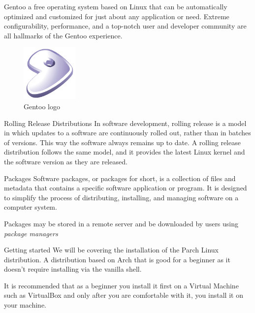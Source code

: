 \documentclass{beamer}
\begin{document}
\begin{frame}{Gentoo}
		a free operating system based on Linux that can be automatically optimized 
		and customized for just about any application or need. Extreme configurability,
		performance, and a top-notch user and developer community are all hallmarks of the Gentoo experience. 
		\begin{figure}
			\begin{center}
				\includegraphics[width=0.25\textwidth]{images/gentoo-logo.png}
			\end{center}
			\caption{Gentoo logo}
		\end{figure}
\end{frame}

\begin{frame}{Rolling Release Distributions}
	In software development, rolling release is a model in which updates to a software are continuously rolled out, 
	rather than in batches of versions. This way the software always remains up to date. A rolling release distribution
	follows the same model, and it provides the latest Linux kernel and the software version as they are released.
\end{frame}

\begin{frame}{Packages}
	Software packages, or packages for short, is a collection of files and metadata that contains a specific software 
	application or program. It is designed to simplify the process of distributing, installing, and managing software 
	on a computer system.

	Packages may be stored in a remote server and be downloaded by users using \textit{package managers}
\end{frame}

\begin{frame}{Getting started}
    We will be covering the installation of the Parch Linux distribution. A distribution based on Arch that
    is good for a beginner as it doesn't require installing via the vanilla shell.

    It is recommended that as a beginner you install it first on a Virtual Machine such as VirtualBox
    and only after you are comfortable with it, you install it on your machine.
\end{frame}
\end{document}
